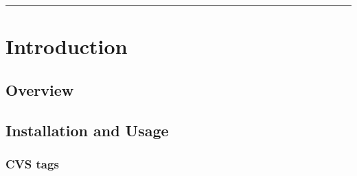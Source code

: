 \documentclass[letterpaper]{book}
\begin{document}
\doparttoc

\frontmatter

\title{\FiPy{}}
\subtitle{A Finite Volume PDE Solver Using Python}

\author{Daniel Wheeler \and Jonathan E. Guyer \and James A. Warren}

\maketitle

\vspace*{\fill}



\rule{\textwidth}{0.1pt}



\tableofcontents

\mainmatter


\part{Introduction}


\renewcommand{\ptctitle}{Introduction Contents}

\parttoc


\chapter{Overview}


  


\chapter{Installation and Usage}
\label{chap:Installation}




\section{CVS tags}
\label{sec:CVS}
\end{document}
